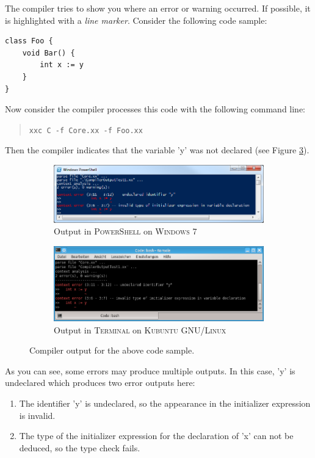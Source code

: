 \documentclass[a5paper]{report}
\def\windows{\textsc{Windows}\xspace}
\def\linux{\textsc{GNU/Linux}\xspace}
\begin{document}
The compiler tries to show you where an error or warning occurred.
If possible, it is highlighted with a \textit{line marker}. Consider the following code sample:
\begin{lstlisting}
class Foo {
    void Bar() {
        int x := y
    }
}
\end{lstlisting}
Now consider the compiler processes this code with the following command line:
\begin{quote}
\texttt{xxc C -f Core.xx -f Foo.xx}
\end{quote}
Then the compiler indicates that the variable 'y' was not declared (see Figure \ref{fig:compiler-output}).
\begin{figure}[ht]
	\centering
	\begin{subfigure}[here]{0.9 \textwidth}
		\includegraphics[width=\textwidth]{images/compiler-output-win32}
		\caption{Output in \textsc{PowerShell} on \windows 7}
		\label{fig:compiler-output-win32}
	\end{subfigure}
	\begin{subfigure}[here]{0.9 \textwidth}
		\includegraphics[width=\textwidth]{images/compiler-output-linux}
		\caption{Output in \textsc{Terminal} on \textsc{Kubuntu} \linux}
		\label{fig:compiler-output-linux}
	\end{subfigure}
	\caption{Compiler output for the above code sample.}
	\label{fig:compiler-output}
\end{figure}
As you can see, some errors may produce multiple outputs. In this case, 'y' is undeclared which produces two error
outputs here:
\begin{enumerate}
	\item The identifier 'y' is undeclared, so the appearance in the initializer expression is invalid.
	\item The type of the initializer expression for the declaration of 'x' can not be deduced, so the type check fails.
\end{enumerate}
\end{document}
